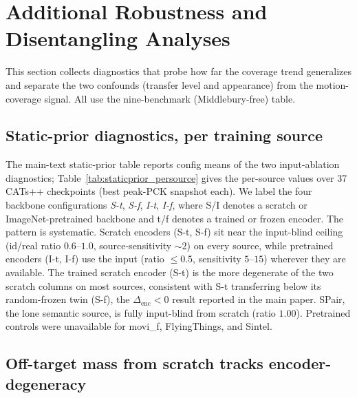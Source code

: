 \documentclass[runningheads]{llncs}
\newcommand{\pck}{PCK}
\begin{document}
\section{Additional Robustness and Disentangling Analyses}
\label{supp:newrobust}
This section collects diagnostics that probe how far the coverage trend
generalizes and separate the two confounds (transfer level and
appearance) from the motion-coverage signal. All use the nine-benchmark
(Middlebury-free) table.

\subsection{Static-prior diagnostics, per training source}
The main-text static-prior table reports config means of the two input-ablation
diagnostics; Table~\ref{tab:staticprior_persource} gives the per-source values
over 37 CATs++ checkpoints (best peak-\pck{} snapshot each). We label the four
backbone configurations \emph{S-t}, \emph{S-f}, \emph{I-t}, \emph{I-f}, where
S/I denotes a scratch or ImageNet-pretrained backbone and t/f denotes a trained
or frozen encoder. The pattern is systematic. Scratch encoders (S-t, S-f) sit
near the input-blind ceiling (id/real ratio $0.6$--$1.0$, source-sensitivity
${\sim}2$) on every source, while pretrained encoders (I-t, I-f) use the input
(ratio ${\le}0.5$, sensitivity $5$--$15$) wherever they are available. The
trained scratch encoder (S-t) is the more degenerate of the two scratch columns
on most sources, consistent with S-t transferring below its random-frozen twin
(S-f), the $\Delta_{\text{enc}}<0$ result reported in the main paper.
SPair, the lone semantic source, is fully input-blind from scratch (ratio
$1.00$). Pretrained controls were unavailable for movi\_f, FlyingThings, and
Sintel.

\begin{table}[h]\centering\small\setlength{\tabcolsep}{4pt}

\caption{Per-source input-ablation diagnostics (CATs++, best snapshots).
id/real flow ratio (${\to}1$ input-blind) and source-sensitivity (high $=$ uses
the input), by training source and backbone configuration. Columns: S/I $=$
scratch / ImageNet-pretrained backbone, t/f $=$ trained / frozen encoder.}
\label{tab:staticprior_persource}
\end{table}

\subsection{Off-target mass from scratch tracks encoder-degeneracy}
\end{document}
